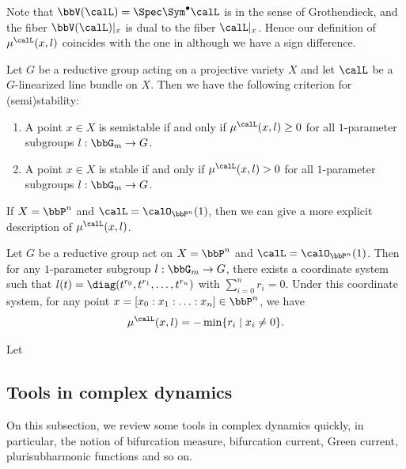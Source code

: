 \begin{remark}
	Note that $\bbV(\calL) = \Spec \Sym^\bullet \calL$ is in the sense of Grothendieck, and the fiber $\bbV(\calL)|_x$ is dual to the fiber $\calL|_x$.
	Hence our definition of $\mu^\calL(x, l)$ coincides with the one in \cite[Definition 2.2]{mumford1994-git} although we have a sign difference.
	\Yang{}
\end{remark}

\begin{theorem}
	Let $G$ be a reductive group acting on a projective variety $X$ and let $\calL$ be a $G$-linearized line bundle on $X$.
	Then we have the following criterion for (semi)stability:
	\begin{enumerate}
		\item A point $x \in X$ is semistable if and only if $\mu^\calL(x, l) \geq 0$ for all $1$-parameter subgroups $l: \bbG_m \to G$.
		\item A point $x \in X$ is stable if and only if $\mu^\calL(x, l) > 0$ for all $1$-parameter subgroups $l: \bbG_m \to G$.
	\end{enumerate}
\end{theorem}

If $X = \bbP^n$ and $\calL = \calO_{\bbP^n}(1)$, then we can give a more explicit description of $\mu^\calL(x, l)$.

\begin{proposition}
	Let $G$ be a reductive group act on $X = \bbP^n$ and $\calL = \calO_{\bbP^n}(1)$.
	Then for any $1$-parameter subgroup $l: \bbG_m \to G$, there exists a coordinate system such that $l(t) = \diag(t^{r_0}, t^{r_1}, \ldots, t^{r_n})$ with $\sum_{i=0}^n r_i = 0$.
	Under this coordinate system, for any point $x = [x_0: x_1: \ldots: x_n] \in \bbP^n$, we have
	\[
		\mu^\calL(x, l) = -\min\{r_i \mid x_i \neq 0\}.
	\]
\end{proposition}

\begin{example}
	Let \Yang{}
\end{example}


\subsection{Tools in complex dynamics}

On this subsection, we review some tools in complex dynamics quickly, in particular, the notion of bifurcation measure, bifurcation current, Green current, plurisubharmonic functions and so on.




































